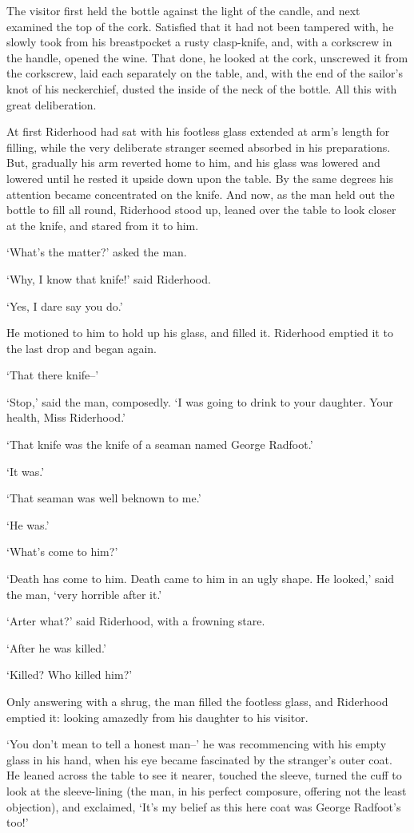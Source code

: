 The visitor first held the bottle against the light of the candle,
and next examined the top of the cork. Satisfied that it had not been
tampered with, he slowly took from his breastpocket a rusty clasp-knife,
and, with a corkscrew in the handle, opened the wine. That done,
he looked at the cork, unscrewed it from the corkscrew, laid each
separately on the table, and, with the end of the sailor’s knot of his
neckerchief, dusted the inside of the neck of the bottle. All this with
great deliberation.

At first Riderhood had sat with his footless glass extended at arm’s
length for filling, while the very deliberate stranger seemed absorbed
in his preparations. But, gradually his arm reverted home to him, and
his glass was lowered and lowered until he rested it upside down upon
the table. By the same degrees his attention became concentrated on
the knife. And now, as the man held out the bottle to fill all round,
Riderhood stood up, leaned over the table to look closer at the knife,
and stared from it to him.

‘What’s the matter?’ asked the man.

‘Why, I know that knife!’ said Riderhood.

‘Yes, I dare say you do.’

He motioned to him to hold up his glass, and filled it. Riderhood
emptied it to the last drop and began again.

‘That there knife--’

‘Stop,’ said the man, composedly. ‘I was going to drink to your
daughter. Your health, Miss Riderhood.’

‘That knife was the knife of a seaman named George Radfoot.’

‘It was.’

‘That seaman was well beknown to me.’

‘He was.’

‘What’s come to him?’

‘Death has come to him. Death came to him in an ugly shape. He looked,’
said the man, ‘very horrible after it.’

‘Arter what?’ said Riderhood, with a frowning stare.

‘After he was killed.’

‘Killed? Who killed him?’

Only answering with a shrug, the man filled the footless glass, and
Riderhood emptied it: looking amazedly from his daughter to his visitor.

‘You don’t mean to tell a honest man--’ he was recommencing with
his empty glass in his hand, when his eye became fascinated by the
stranger’s outer coat. He leaned across the table to see it nearer,
touched the sleeve, turned the cuff to look at the sleeve-lining (the
man, in his perfect composure, offering not the least objection), and
exclaimed, ‘It’s my belief as this here coat was George Radfoot’s too!’

